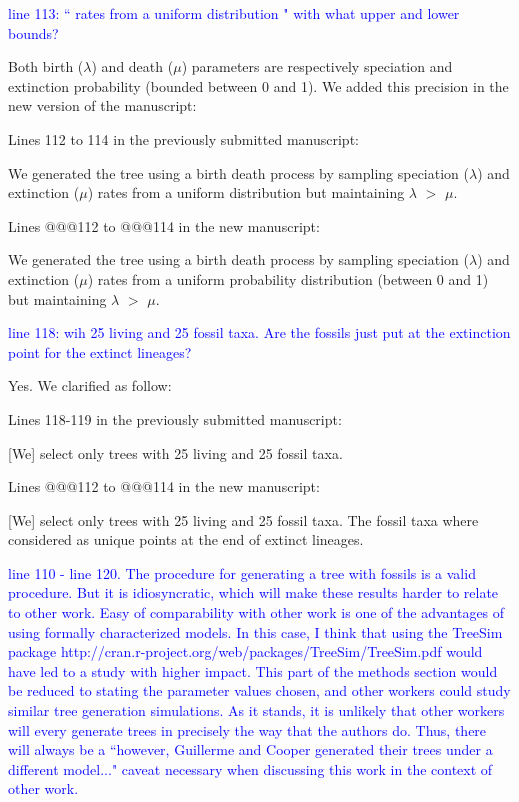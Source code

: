 \documentclass[11pt]{letter}
\begin{document}
\begin{letter}{}
\textcolor{blue}{line 113: `` rates from a uniform distribution " with what upper and lower bounds?}

Both birth ($\lambda$) and death ($\mu$) parameters are respectively speciation and extinction probability (bounded between 0 and 1). We added this precision in the new version of the manuscript:

Lines 112 to 114 in the previously submitted manuscript:

\hfill\begin{minipage}{\dimexpr\textwidth-1cm}
We generated the tree using a birth death process by sampling speciation ($\lambda$) and extinction ($\mu$) rates from a uniform distribution but maintaining $\lambda$ $>$ $\mu$.
\end{minipage}

Lines @@@112 to @@@114 in the new manuscript:

\hfill\begin{minipage}{\dimexpr\textwidth-1cm}
We generated the tree using a birth death process by sampling speciation ($\lambda$) and extinction ($\mu$) rates from a uniform probability distribution (between 0 and 1) but maintaining $\lambda$ $>$ $\mu$.
\end{minipage}

\textcolor{blue}{line 118: wih 25 living and 25 fossil taxa. Are the fossils just put at the extinction point for the extinct lineages?}

Yes. We clarified as follow:

Lines 118-119 in the previously submitted manuscript:

\hfill\begin{minipage}{\dimexpr\textwidth-1cm}
[We] select only trees with 25 living and 25 fossil taxa.
\end{minipage}

Lines @@@112 to @@@114 in the new manuscript:

\hfill\begin{minipage}{\dimexpr\textwidth-1cm}
[We] select only trees with 25 living and 25 fossil taxa. The fossil taxa where considered as unique points at the end of extinct lineages.
\end{minipage}

\textcolor{blue}{line 110 - line 120. The procedure for generating a tree with fossils is a valid procedure. But it is idiosyncratic, which will make these results harder to relate to other work. Easy of comparability with other work is one of the advantages of using formally characterized models. In this case, I think that using the TreeSim package http://cran.r-project.org/web/packages/TreeSim/TreeSim.pdf would have led to a study with higher impact. This part of the methods section would be reduced to stating the parameter values chosen, and other workers could study similar tree generation simulations. As it stands, it is unlikely that other workers will every generate trees in precisely the way that the authors do. Thus, there will always be a ``however, Guillerme and Cooper generated their trees under a different model..." caveat necessary when discussing this work in the context of other work.}


\end{letter}
\end{document}
